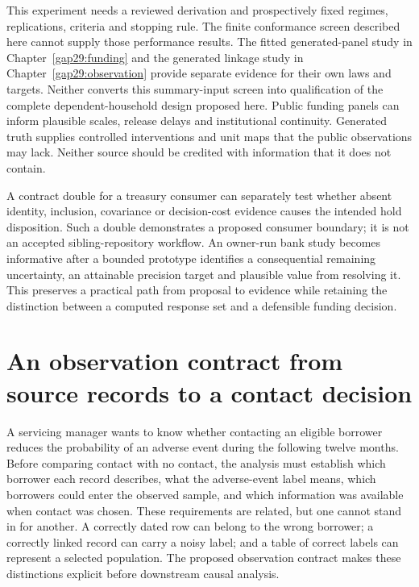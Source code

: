 This experiment needs a reviewed derivation and prospectively fixed
regimes, replications, criteria and stopping rule. The finite conformance screen described here cannot supply those performance results. The fitted generated-panel study in Chapter~\ref{gap29:funding} and the generated linkage study in Chapter~\ref{gap29:observation} provide separate evidence for their own laws and targets. Neither converts this summary-input screen into qualification of the complete dependent-household design proposed here. Public funding
panels can inform plausible scales, release delays and institutional
continuity. Generated truth supplies controlled interventions and unit maps
that the public observations may lack. Neither source should be credited
with information that it does not contain.

A contract double for a treasury consumer can separately test whether absent
identity, inclusion, covariance or decision-cost evidence causes the intended
hold disposition. Such a double demonstrates a proposed consumer boundary;
it is not an accepted sibling-repository workflow. An owner-run bank study
becomes informative after a bounded prototype identifies a consequential
remaining uncertainty, an attainable precision target and plausible value
from resolving it. This preserves a practical path from proposal to evidence
while retaining the distinction between a computed response set and a
defensible funding decision.
\label{exec13:funding-journey-end}


\section{An observation contract from source records to a contact decision}
\label{exec13:observation-journey}

A servicing manager wants to know whether contacting an eligible borrower
reduces the probability of an adverse event during the following twelve
months. Before comparing contact with no contact, the analysis must establish
which borrower each record describes, what the adverse-event label means,
which borrowers could enter the observed sample, and which information was
available when contact was chosen. These requirements are related, but one
cannot stand in for another. A correctly dated row can belong to the wrong
borrower; a correctly linked record can carry a noisy label; and a table of
correct labels can represent a selected population. The proposed observation
contract makes these distinctions explicit before downstream causal analysis.

